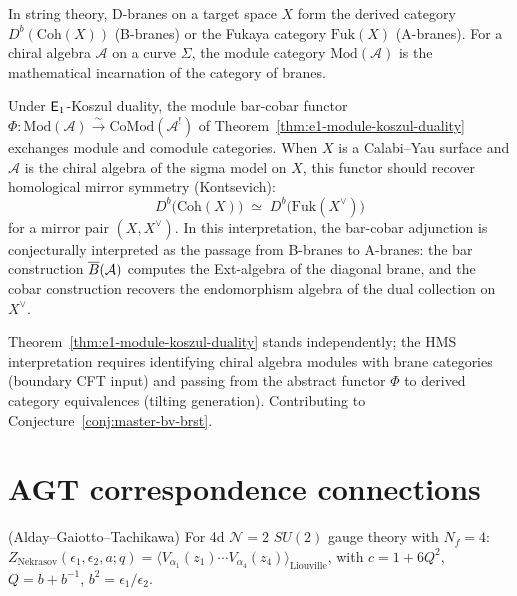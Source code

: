 \begin{conjecture}
\label{conj:hms-koszul}
In string theory, D-branes on a target space $X$ form the derived category
$D^b(\mathrm{Coh}(X))$ (B-branes) or the Fukaya category $\mathrm{Fuk}(X)$
(A-branes).  For a chiral algebra $\mathcal{A}$ on a curve $\Sigma$, the
module category $\mathrm{Mod}(\mathcal{A})$ is the mathematical incarnation
of the category of branes.

Under $\mathsf{E}_1$-Koszul duality, the module bar-cobar functor
$\Phi\colon \mathrm{Mod}(\mathcal{A}) \xrightarrow{\sim}
\mathrm{CoMod}(\mathcal{A}^!)$
of Theorem~\ref{thm:e1-module-koszul-duality} exchanges module and comodule
categories.  When $X$ is a Calabi--Yau surface and $\mathcal{A}$ is the chiral
algebra of the sigma model on $X$, this functor should recover homological
mirror symmetry (Kontsevich):
\[
D^b\bigl(\mathrm{Coh}(X)\bigr)
\;\simeq\;
D^b\bigl(\mathrm{Fuk}(X^\vee)\bigr)
\]
for a mirror pair $(X, X^\vee)$.  In this interpretation, the bar-cobar
adjunction is conjecturally interpreted as the passage from B-branes to A-branes: the bar construction
$\overline{B}(\mathcal{A})$ computes the Ext-algebra of the diagonal brane,
and the cobar construction recovers the endomorphism algebra of the dual
collection on $X^\vee$.
\end{conjecture}

\begin{remark}[Scope]
Theorem~\ref{thm:e1-module-koszul-duality} stands independently; the HMS interpretation requires identifying chiral algebra modules with brane categories (boundary CFT input) and passing from the abstract functor $\Phi$ to derived category equivalences (tilting generation).  Contributing to Conjecture~\ref{conj:master-bv-brst}.
\end{remark}


\section{AGT correspondence connections}
\label{sec:agt}

\begin{theorem}\label{thm:agt}
(Alday--Gaiotto--Tachikawa) For 4d $\mathcal{N}=2$ $SU(2)$ gauge theory with $N_f=4$: $Z_{\mathrm{Nekrasov}}(\epsilon_1,\epsilon_2,a;q) = \langle V_{\alpha_1}(z_1)\cdots V_{\alpha_4}(z_4)\rangle_{\mathrm{Liouville}}$, with $c = 1+6Q^2$, $Q=b+b^{-1}$, $b^2=\epsilon_1/\epsilon_2$.
\end{theorem}

